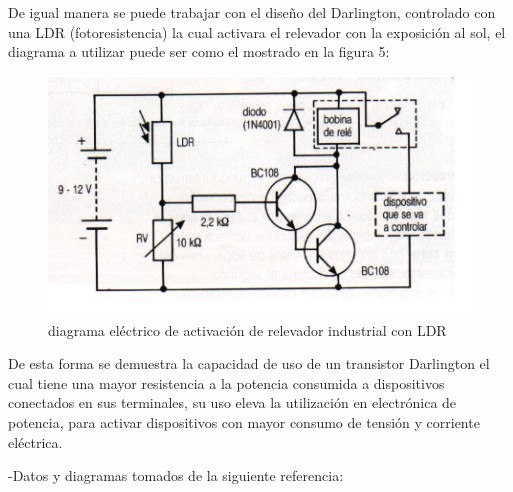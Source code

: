 \documentclass[11pt,a4paper]{article}
\begin{document}
\newpage

De igual manera se puede trabajar con el diseño del Darlington, controlado con una LDR (fotoresistencia) la cual activara el relevador con la exposición al sol, el diagrama a utilizar puede ser como el mostrado en la figura 5:

\begin{figure}[h]
\begin{center}
\includegraphics[scale=0.5]{4.png}
\caption{diagrama eléctrico de activación de relevador industrial con LDR}
\end{center}
\end{figure}

De esta forma se demuestra la capacidad de uso de un transistor Darlington el cual tiene una mayor resistencia a la potencia consumida a dispositivos conectados en sus terminales, su uso eleva la utilización en electrónica de potencia, para activar dispositivos con mayor consumo de tensión y corriente eléctrica.



-Datos y diagramas tomados de la siguiente referencia:\cite{morenoanalisis}

 

\end{document}
